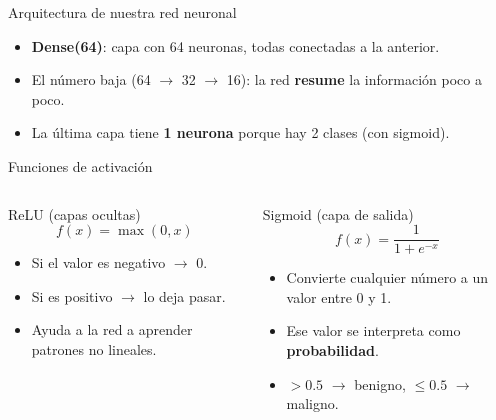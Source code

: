 \documentclass[10pt,aspectratio=169]{beamer}
\begin{document}
\begin{frame}{Arquitectura de nuestra red neuronal}
  \begin{center}
  \end{center}

  \pause
  \begin{itemize}
    \item \textbf{Dense(64)}: capa con 64 neuronas, todas conectadas a la anterior.
    \item El número baja (64 $\rightarrow$ 32 $\rightarrow$ 16): la red
          \textbf{resume} la información poco a poco.
    \item La última capa tiene \textbf{1 neurona} porque hay 2 clases (con sigmoid).
  \end{itemize}
\end{frame}

\begin{frame}{Funciones de activación}
  \begin{columns}
    \begin{block}{ReLU (capas ocultas)}
      \[
        f(x) = \max(0, x)
      \]
      \begin{itemize}
        \item Si el valor es negativo $\rightarrow$ 0.
        \item Si es positivo $\rightarrow$ lo deja pasar.
        \item Ayuda a la red a aprender patrones no lineales.
      \end{itemize}
    \end{block}

    \begin{block}{Sigmoid (capa de salida)}
      \[
        f(x) = \frac{1}{1 + e^{-x}}
      \]
      \begin{itemize}
        \item Convierte cualquier número a un valor entre 0 y 1.
        \item Ese valor se interpreta como \textbf{probabilidad}.
        \item $>0.5$ $\rightarrow$ benigno, $\leq0.5$ $\rightarrow$ maligno.
      \end{itemize}
    \end{block}
  \end{columns}
\end{frame}
\end{document}
